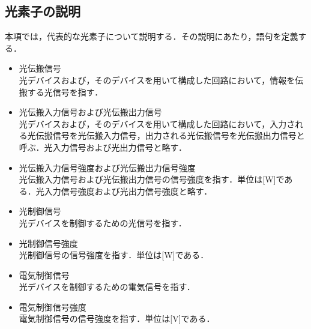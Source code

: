\subsection{光素子の説明}
本項では，代表的な光素子について説明する．その説明にあたり，語句を定義する．
\begin{itemize}
\item 光伝搬信号\\
光デバイスおよび，そのデバイスを用いて構成した回路において，情報を伝搬する光信号を指す．
\item 光伝搬入力信号および光伝搬出力信号\\
光デバイスおよび，そのデバイスを用いて構成した回路において，入力される光伝搬信号を光伝搬入力信号，出力される光伝搬信号を光伝搬出力信号と呼ぶ．光入力信号および光出力信号と略す．
\item 光伝搬入力信号強度および光伝搬出力信号強度\\
光伝搬入力信号および光伝搬出力信号の信号強度を指す．単位は[W]である．光入力信号強度および光出力信号強度と略す．
\item 光制御信号\\
光デバイスを制御するための光信号を指す．
\item 光制御信号強度\\
光制御信号の信号強度を指す．単位は[W]である．
\item 電気制御信号\\
光デバイスを制御するための電気信号を指す．
\item 電気制御信号強度\\
電気制御信号の信号強度を指す．単位は[V]である．
\end{itemize}

